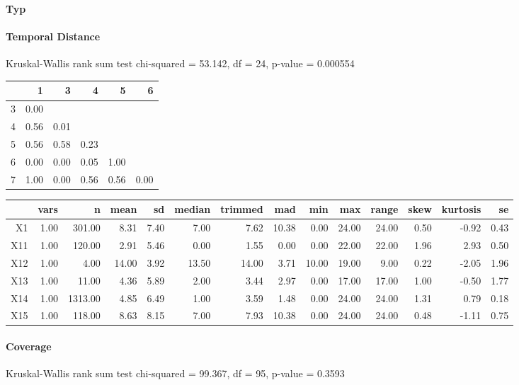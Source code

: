 \large
\centerline{\textbf{Typ}}
\normalsize

\paragraph{Temporal Distance}
Kruskal-Wallis rank sum test chi-squared = 53.142, df = 24, p-value = 0.000554

\begin{tabular}{rrrrrr}
  \hline
 & 1 & 3 & 4 & 5 & 6 \\ 
  \hline
3 & 0.00 &  &  &  &  \\ 
  4 & 0.56 & 0.01 &  &  &  \\ 
  5 & 0.56 & 0.58 & 0.23 &  &  \\ 
  6 & 0.00 & 0.00 & 0.05 & 1.00 &  \\ 
  7 & 1.00 & 0.00 & 0.56 & 0.56 & 0.00 \\ 
   \hline
\end{tabular}

\begin{tabular}{rrrrrrrrrrrrrr}
  \hline
 & vars & n & mean & sd & median & trimmed & mad & min & max & range & skew & kurtosis & se \\ 
  \hline
X1 & 1.00 & 301.00 & 8.31 & 7.40 & 7.00 & 7.62 & 10.38 & 0.00 & 24.00 & 24.00 & 0.50 & -0.92 & 0.43 \\ 
  X11 & 1.00 & 120.00 & 2.91 & 5.46 & 0.00 & 1.55 & 0.00 & 0.00 & 22.00 & 22.00 & 1.96 & 2.93 & 0.50 \\ 
  X12 & 1.00 & 4.00 & 14.00 & 3.92 & 13.50 & 14.00 & 3.71 & 10.00 & 19.00 & 9.00 & 0.22 & -2.05 & 1.96 \\ 
  X13 & 1.00 & 11.00 & 4.36 & 5.89 & 2.00 & 3.44 & 2.97 & 0.00 & 17.00 & 17.00 & 1.00 & -0.50 & 1.77 \\ 
  X14 & 1.00 & 1313.00 & 4.85 & 6.49 & 1.00 & 3.59 & 1.48 & 0.00 & 24.00 & 24.00 & 1.31 & 0.79 & 0.18 \\ 
  X15 & 1.00 & 118.00 & 8.63 & 8.15 & 7.00 & 7.93 & 10.38 & 0.00 & 24.00 & 24.00 & 0.48 & -1.11 & 0.75 \\ 
   \hline
\end{tabular}

\paragraph{Coverage}
Kruskal-Wallis rank sum test chi-squared = 99.367, df = 95, p-value = 0.3593

